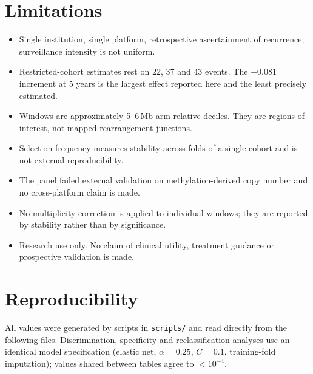 \documentclass[11pt]{article}
\begin{document}
\section{Limitations}

\begin{itemize}\itemsep2pt
\item Single institution, single platform, retrospective ascertainment of
      recurrence; surveillance intensity is not uniform.
\item Restricted-cohort estimates rest on 22, 37 and 43 events. The
      $+0.081$ increment at 5 years is the largest effect reported here and the
      least precisely estimated.
\item Windows are approximately 5--6\,Mb arm-relative deciles. They are regions
      of interest, not mapped rearrangement junctions.
\item Selection frequency measures stability across folds of a single cohort and
      is not external reproducibility.
\item The panel failed external validation on methylation-derived copy number
      and no cross-platform claim is made.
\item No multiplicity correction is applied to individual windows; they are
      reported by stability rather than by significance.
\item Research use only. No claim of clinical utility, treatment guidance or
      prospective validation is made.
\end{itemize}

\section{Reproducibility}\label{sec:repro}

All values were generated by scripts in \texttt{scripts/} and read directly from
the following files. Discrimination, specificity and reclassification analyses
use an identical model specification (elastic net, $\alpha=0.25$, $C=0.1$,
training-fold imputation); values shared between tables agree to
$<\!10^{-4}$.
\end{document}
